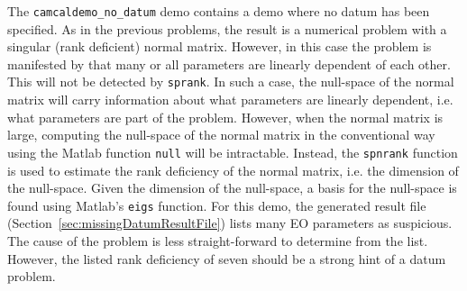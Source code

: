 \documentclass{article}
\begin{document}
The \texttt{camcaldemo\_no\_datum} demo contains a demo where no datum
has been specified. As in the previous problems, the result is a
numerical problem with a singular (rank deficient) normal matrix.
However, in this case the problem is manifested by that many or all
parameters are linearly dependent of each other. This will not be
detected by \texttt{sprank}. In such a case, the null-space of the
normal matrix will carry information about what parameters are
linearly dependent, i.e. what parameters are part of the problem.
However, when the normal matrix is large, computing the null-space of
the normal matrix in the conventional way using the Matlab function
\texttt{null} will be intractable. Instead, the \texttt{spnrank}
\citep{Foster2009:Calculating} function is used to estimate the rank
deficiency of the normal matrix, i.e. the dimension of the null-space.
Given the dimension of the null-space, a basis for the null-space is
found using Matlab's \texttt{eigs} function. For this demo, the
generated result file (Section~\ref{sec:missingDatumResultFile}) lists
many EO parameters as suspicious. The cause of the problem is less
straight-forward to determine from the list. However, the listed rank
deficiency of seven should be a strong hint of a datum problem.
\end{document}
